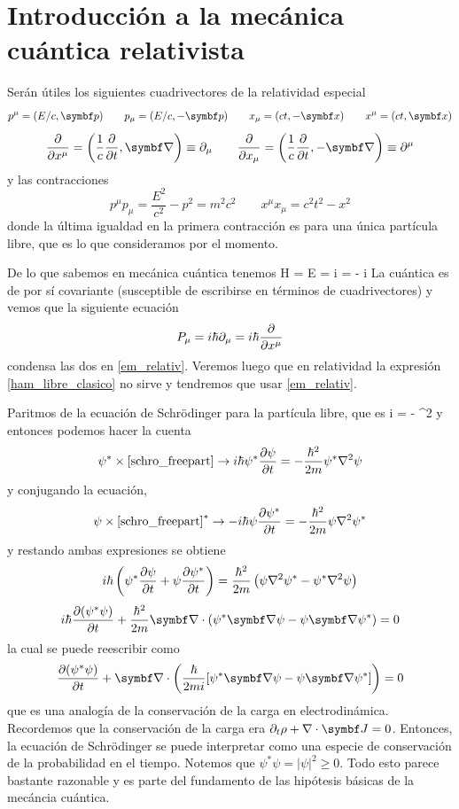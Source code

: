 \documentclass[10pt,oneside]{CBFT_book}
\begin{document}
\chapter{Introducción a la mecánica cuántica relativista}

Serán útiles los siguientes cuadrivectores de la relatividad especial
\[
	p^\mu = (E/c, \vb{p}) \qquad p_\mu = (E/c, -\vb{p}) 
	\qquad x_\mu = (ct, -\vbx ) \qquad x^\mu = (ct, \vb{x})
\]
\[
	\dpar{}{x^\mu} = \left( \frac{1}{c}\dpar{}{t} , \Nabla \right) \equiv \partial_\mu
	\qquad \dpar{}{x_\mu} = \left( \frac{1}{c}\dpar{}{t} , -\Nabla \right) \equiv \partial^\mu
\]
y las contracciones
\[
	p^\mu p_\mu  = \frac{E^2}{c^2} - p^2 = m^2 c^2 
	\qquad 
	x^\mu x_\mu  = c^2 t^2 - x^2 
\]
donde la última igualdad en la primera contracción es para una única partícula libre, que es lo que
consideramos por el momento.

De lo que sabemos en mecánica cuántica tenemos 
\be
	H =  
	\label{ham_libre_clasico}
\ee
\be
	E =  i\hbar {} \quad {} = - i\hbar \Nabla
	\label{em_relativ}
\ee
La cuántica es de por sí covariante (susceptible de escribirse en términos de cuadrivectores)
y vemos que la siguiente ecuación
\[
	P_\mu = i \hbar \partial_\mu = i \hbar \frac{\partial^{\hspace{-0.05em}} {}}{\partial {x^\mu}^{\hspace{-0.05em}}}
\]
condensa las dos en \eqref{em_relativ}.
Veremos luego que en relatividad la expresión \eqref{ham_libre_clasico} no sirve y tendremos que
usar \eqref{em_relativ}.

Paritmos de la ecuación de Schrödinger para la partícula libre, que es
\be 
	i \hbar {} = -  \nabla^2 \psi
	\label{schro_freepart}
\ee
y entonces podemos hacer la cuenta 
\[
	\psi^* \times \eqref{schro_freepart} \rightarrow  
	i \hbar \psi^*\frac{\partial^{\hspace{-0.05em}} {\psi}}{\partial {t}^{\hspace{-0.05em}}} = - \frac{\hbar^2}{2m} \psi^* \nabla^2 \psi
\]
y conjugando la ecuación,
\[
	\psi \times \eqref{schro_freepart}^* \rightarrow  
	-i \hbar \psi\frac{\partial^{\hspace{-0.05em}} {\psi^*}}{\partial {t}^{\hspace{-0.05em}}} = - \frac{\hbar^2}{2m} \psi \nabla^2 \psi^*
\]
y restando ambas expresiones se obtiene 
\[
	i \hbar \left( \psi^*\frac{\partial^{\hspace{-0.05em}} {\psi}}{\partial {t}^{\hspace{-0.05em}}} + \psi\frac{\partial^{\hspace{-0.05em}} {\psi^*}}{\partial {t}^{\hspace{-0.05em}}} \right) =
	\frac{\hbar^2}{2m} \left( \psi \nabla^2 \psi^* -\psi^* \nabla^2 \psi \right)
\]
\[
	i \hbar  \dpar{ (\psi^* \psi) }{t} + \frac{\hbar^2}{2m} 
	\Nabla \cdot \left( \psi^* \Nabla \psi - \psi \Nabla \psi^* \right) = 0
\]
la cual se puede reescribir como
\[
	\dpar{ (\psi^* \psi) }{t} +  
	\Nabla \cdot \left( \frac{\hbar}{2mi} [\psi^* \Nabla \psi - \psi \Nabla \psi^*] \right) = 0
\]
que es una analogía de la conservación de la carga en electrodinámica. 
Recordemos que la conservación de la carga era
$ \partial_t \rho + \nabla \cdot \vb{J} = 0$.
Entonces, la ecuación de Schrödinger se puede interpretar como una especie de conservación de la probabilidad
en el tiempo. Notemos que $\psi^* \psi = |\psi|^2 \geq 0$.
Todo esto parece bastante razonable y es parte del fundamento de las hipótesis básicas de la
mecáncia cuántica.
\end{document}
